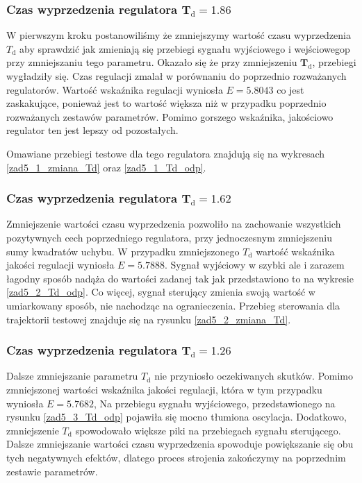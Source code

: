 \subsubsection{Czas wyprzedzenia regulatora $\mathbf{T_{\mathrm{d}}}=\num{1,86}$}
W pierwszym kroku postanowiliśmy że zmniejszymy wartość czasu wyprzedzenia $T_{\mathrm{d}}$
aby sprawdzić jak zmieniają się przebiegi sygnału wyjściowego i wejściowegop przy zmniejszaniu
tego parametru. Okazało się że przy zmniejszeniu $\mathbf{T_{\mathrm{d}}}$, przebiegi wygładziły się.
Czas regulacji zmalał w porównaniu do poprzednio rozważanych regulatorów. Wartość wskaźnika regulacji 
wyniosła $E = \num{5,8043}$ co jest zaskakujące, ponieważ jest to wartość większa niż w przypadku poprzednio
rozważanych zestawów parametrów. Pomimo gorszego wskaźnika, jakościowo regulator ten jest lepszy od pozostałych.

Omawiane przebiegi testowe dla tego regulatora znajdują się na wykresach \ref{zad5_1_zmiana_Td} oraz \ref{zad5_1_Td_odp}.

\subsubsection{Czas wyprzedzenia regulatora $\mathbf{T_{\mathrm{d}}}=\num{1,62}$}
Zmniejszenie wartości czasu wyprzedzenia pozwoliło na zachowanie wszystkich pozytywnych cech
poprzedniego regulatora, przy jednoczesnym zmniejszeniu sumy kwadratów uchybu. W przypadku zmniejszonego $T_{\mathrm{d}}$
wartość wskaźnika jakości regulacji wyniosła $E = \num{5,7888}$. Sygnał wyjściowy w szybki ale i zarazem łagodny 
sposób nadąża do wartości zadanej tak jak przedstawiono to na wykresie \ref{zad5_2_Td_odp}. Co więcej,
sygnał sterujący zmienia swoją wartość w umiarkowany sposób, nie nachodząc na ogranieczenia. Przebieg 
sterowania dla trajektorii testowej znajduje się na rysunku \ref{zad5_2_zmiana_Td}.

\subsubsection{Czas wyprzedzenia regulatora $\mathbf{T_{\mathrm{d}}}=\num{1,26}$}
Dalsze zmniejszanie parametru $T_{\mathrm{d}}$ nie przyniosło oczekiwanych skutków. Pomimo
zmniejszonej wartości wskaźnika jakości regulacji, która w tym przypadku wyniosła $E=\num{5,7682}$,
Na przebiegu sygnału wyjściowego, przedstawionego na rysunku \ref{zad5_3_Td_odp} pojawiła się mocno tłumiona
oscylacja. Dodatkowo, zmniejszenie $T_{\mathrm{d}}$ spowodowało większe piki na przebiegach 
sygnału sterującego. Dalsze zmniejszanie wartości czasu wyprzedzenia spowoduje powiększanie się obu tych negatywnych
efektów, dlatego proces strojenia zakończymy na poprzednim zestawie parametrów.

